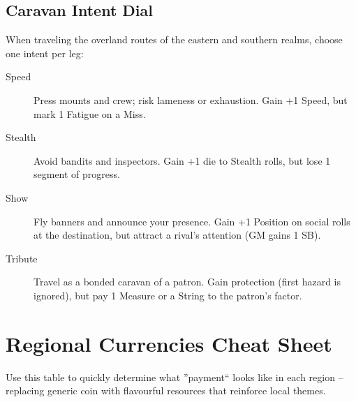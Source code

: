 \documentclass[11pt,letterpaper,twoside]{book}
\begin{document}
\subsection{Caravan Intent Dial}
When traveling the overland routes of the eastern and southern realms, choose one intent per leg:
\begin{description}
    \item[Speed] Press mounts and crew; risk lameness or exhaustion. Gain +1 Speed, but mark 1 Fatigue on a Miss.
    \item[Stealth] Avoid bandits and inspectors. Gain +1 die to Stealth rolls, but lose 1 segment of progress.
    \item[Show] Fly banners and announce your presence. Gain +1 Position on social rolls at the destination, but attract a rival's attention (GM gains 1 SB).
    \item[Tribute] Travel as a bonded caravan of a patron. Gain protection (first hazard is ignored), but pay 1 Measure or a String to the patron's factor.
\end{description}

\section*{Regional Currencies Cheat Sheet}

Use this table to quickly determine what ''payment`` looks like in each region -- replacing generic coin with flavourful resources that reinforce local themes.
\end{document}
